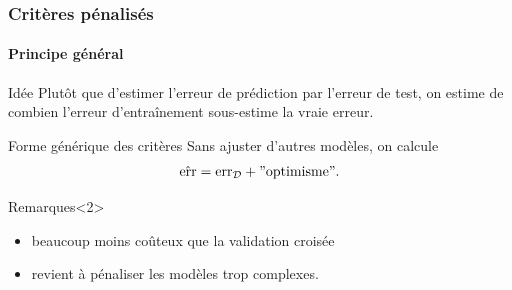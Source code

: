 \documentclass{beamer}\usepackage[]{graphicx}\usepackage[]{color}
\begin{document}






\begin{frame}
  \frametitle{Critères pénalisés}
  \framesubtitle{Principe général}
  
  \begin{block}{Idée}
    Plutôt que d'estimer l'erreur de  prédiction par l'erreur de test,
    on estime de combien  l'erreur d'entraînement sous-estime la vraie
    erreur.
  \end{block}

  \vfill
  
  \begin{block}{Forme générique des critères}
    Sans ajuster d'autres modèles, on calcule
    \begin{equation*}
      \hat{\mathrm{err}} = \mathrm{err}_{\mathcal{D}} + \mathrm{"optimisme"}.
    \end{equation*}
  \end{block}

  \vfill
  
  \begin{block}{Remarques}<2>
    \begin{itemize}
    \item beaucoup moins coûteux que la validation croisée
    \item revient à \og pénaliser \fg les modèles trop complexes.
    \end{itemize}
  \end{block}

\end{frame}
\end{document}
